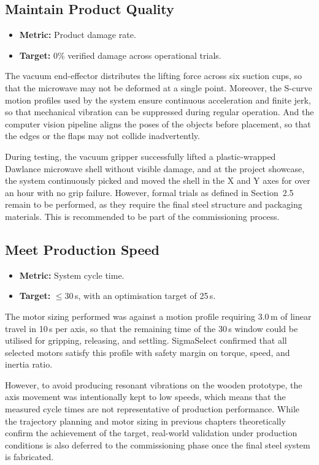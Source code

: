 \subsection{Maintain Product Quality}

\begin{itemize}
    \item \textbf{Metric:} Product damage rate.
    \item \textbf{Target:} 0\% verified damage across operational trials.
\end{itemize}

The vacuum end-effector distributes the lifting force across six suction cups, so that the microwave may not be deformed at a single point. Moreover, the S-curve motion profiles used by the system ensure continuous acceleration and finite jerk, so that mechanical vibration can be suppressed during regular operation. And the computer vision pipeline aligns the poses of the objects before placement, so that the edges or the flaps may not collide inadvertently.

During testing, the vacuum gripper successfully lifted a plastic-wrapped Dawlance microwave shell without visible damage, and at the project showcase, the system continuously picked and moved the shell in the X and Y axes for over an hour with no grip failure. However, formal trials as defined in Section~2.5 remain to be performed, as they require the final steel structure and packaging materials. This is recommended to be part of the commissioning process.

\subsection{Meet Production Speed}

\begin{itemize}
    \item \textbf{Metric:} System cycle time.
    \item \textbf{Target:} $\leq 30$\,s, with an optimisation target of 25\,s.
\end{itemize}

The motor sizing performed was against a motion profile requiring 3.0\,m of linear travel in 10\,s per axis, so that the remaining time of the 30\,s window could be utilised for gripping, releasing, and settling. SigmaSelect confirmed that all selected motors satisfy this profile with safety margin on torque, speed, and inertia ratio.

However, to avoid producing resonant vibrations on the wooden prototype, the axis movement was intentionally kept to low speeds, which means that the measured cycle times are not representative of production performance. While the trajectory planning and motor sizing in previous chapters theoretically confirm the achievement of the target, real-world validation under production conditions is also deferred to the commissioning phase once the final steel system is fabricated.

